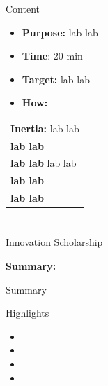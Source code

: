 \documentclass[12pt]{beamer}
\begin{document}
\begin{frame}
\titlepage
\end{frame}





\begin{frame}{Content}
\begin{itemize}
\item \textbf{Purpose:} lab lab 
\item \textbf{Time}: 20 min
\item \textbf{Target:} lab lab  
\item \textbf{How:} 
\end{itemize}
\begin{center}
\begin{tabular}{|l|} 
\hline
\rowcolor{Gray} \textbf{Inertia:} lab lab \\
 \textbf{lab lab }\\
 \rowcolor{Gray} \textbf{lab lab } lab lab \\
 \textbf{lab lab }\\
 \rowcolor{Gray} \textbf{lab lab }\\
\hline
\end{tabular}
\end{center}



\end{frame}
\section{}
\begin{frame}{Innovation Scholarship}
\centering \begin{block}{}
\textbf{Summary:}
\end{block} 
\end{frame}

\begin{frame}{Summary}
\begin{block}{Highlights}
{\scriptsize
\begin{itemize}
\item<1-> 
\item<2-> 
\item<3-> 
\item<4-> 
\begin{enumerate}[I]
{\scriptsize
\item 
\item 
\item  
}



\end{enumerate}       
\end{itemize}
}
\end{block}
\end{frame}
\end{document}
